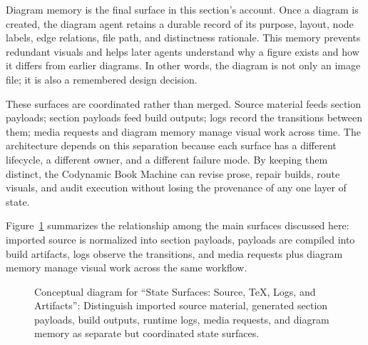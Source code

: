 Diagram memory is the final surface in this section's account. Once a diagram is created, the diagram agent retains a durable record of its purpose, layout, node labels, edge relations, file path, and distinctness rationale. This memory prevents redundant visuals and helps later agents understand why a figure exists and how it differs from earlier diagrams. In other words, the diagram is not only an image file; it is also a remembered design decision.

These surfaces are coordinated rather than merged. Source material feeds section payloads; section payloads feed build outputs; logs record the transitions between them; media requests and diagram memory manage visual work across time. The architecture depends on this separation because each surface has a different lifecycle, a different owner, and a different failure mode. By keeping them distinct, the Codynamic Book Machine can revise prose, repair builds, route visuals, and audit execution without losing the provenance of any one layer of state.

Figure~\ref{fig:state-surfaces} summarizes the relationship among the main surfaces discussed here: imported source is normalized into section payloads, payloads are compiled into build artifacts, logs observe the transitions, and media requests plus diagram memory manage visual work across the same workflow.

\begin{figure}[htbp]
\centering

\caption{Conceptual diagram for ``State Surfaces: Source, TeX, Logs, and Artifacts'': Distinguish imported source material, generated section payloads, build outputs, runtime logs, media requests, and diagram memory as separate but coordinated state surfaces.}
\label{fig:state-surfaces}
\end{figure}

